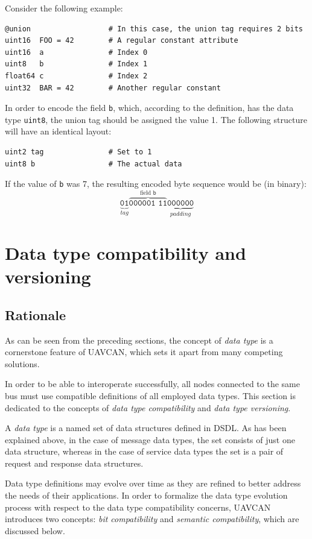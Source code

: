 Consider the following example:

\begin{verbatim}
@union                  # In this case, the union tag requires 2 bits
uint16  FOO = 42        # A regular constant attribute
uint16  a               # Index 0
uint8   b               # Index 1
float64 c               # Index 2
uint32  BAR = 42        # Another regular constant
\end{verbatim}

In order to encode the field \verb|b|, which, according to the definition,
has the data type \verb|uint8|, the union tag should be assigned the value 1.
The following structure will have an identical layout:

\begin{verbatim}
uint2 tag               # Set to 1
uint8 b                 # The actual data
\end{verbatim}

If the value of \verb|b| was 7, the resulting encoded byte sequence would be (in binary):
$$%
\underbrace{\texttt{01}}_{tag}%
\overbrace{\texttt{000001 11}}^{\text{field }\texttt{b}}%
\underbrace{\texttt{000000}}_{padding}%
$$

\section{Data type compatibility and versioning}\label{sec:dsdl_versioning}

\subsection{Rationale}

As can be seen from the preceding sections,
the concept of \emph{data type} is a cornerstone feature of UAVCAN,
which sets it apart from many competing solutions.

In order to be able to interoperate successfully,
all nodes connected to the same bus must use compatible definitions of all employed data types.
This section is dedicated to the concepts of \emph{data type compatibility}
and \emph{data type versioning}.

A \emph{data type} is a named set of data structures defined in DSDL.
As has been explained above, in the case of message data types,
the set consists of just one data structure, whereas in the case of service data types
the set is a pair of request and response data structures.

Data type definitions may evolve over time as they are refined to better address the needs of their applications.
In order to formalize the data type evolution process with respect to the data type compatibility concerns,
UAVCAN introduces two concepts: \emph{bit compatibility} and \emph{semantic compatibility},
which are discussed below.

